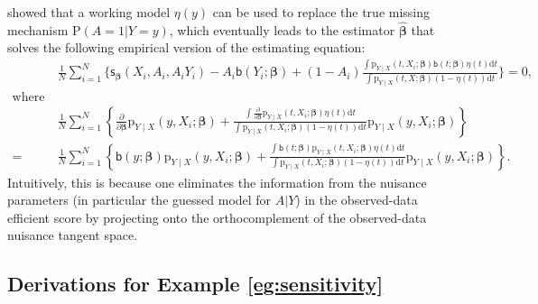 \documentclass{article}
\def\sfb{\mathsf{b}}
\def\sfb{\mathsf{b}}
\def\sfs{\mathsf{s}}
\theoremstyle{plain}
\theoremstyle{definition}
\theoremstyle{remark}
\def\P{\mathrm{P}}
\def\bbeta{\boldsymbol{\beta}}
\def\hat{\widehat}
\def\p{\mathrm{p}}
\begin{document}
\citet{zhao2022versatile} showed that a working model $\eta (y)$ can be used to replace the true missing mechanism $\P (A = 1 | Y = y)$, which eventually leads to the estimator $\hat{\bbeta}$ that solves the following empirical version of the estimating equation:
\begin{equation*}
\begin{aligned}
& \ \frac{1}{N} \sum_{i=1}^N \Bigg\{\sfs_\bbeta \left(X_i, A_i, A_i Y_i\right)-A_i \sfb\left(Y_i ; \bbeta\right)+\left(1-A_i\right) \frac{\int \p_{Y \mid X}\left(t, X_i ; \bbeta\right) \sfb(t ; \bbeta) \eta(t) \mathrm{d} t}{\int \p_{Y \mid X}(t, X ; \bbeta)\left(1-\eta(t)\right) \mathrm{d} t}\Bigg\}=0, \\
 \text{where} & \\
& \ \frac{1}{N} \sum_{i=1}^N\left\{\frac{\partial}{\partial \bbeta} \p_{Y \mid X}\left(y, X_i ; \bbeta\right)+\frac{\int \frac{\partial}{\partial \bbeta} \p_{Y \mid X}\left(t, X_i ; \bbeta\right) \eta (t) \mathrm{d} t}{\int \p_{Y \mid X}\left(t, X_i ; \bbeta\right)\left(1-\eta(t)\right) \mathrm{d} t} \p_{Y \mid X}\left(y, X_i ; \bbeta\right)\right\} \\
= & \ \frac{1}{N} \sum_{i=1}^N\left\{\sfb (y ; \bbeta) \p_{Y \mid X}\left(y, X_i ; \bbeta\right)+\frac{\int \sfb(t ; \bbeta) \p_{Y \mid X}\left(t, X_i ; \bbeta\right) \eta (t) \mathrm{d} t}{\int \p_{Y \mid X}\left(t, X_i ; \bbeta\right)\left(1-\eta(t)\right) \mathrm{d} t} \p_{Y \mid X}\left(y, X_i ; \bbeta\right)\right\} .
\end{aligned}
\end{equation*}
Intuitively, this is because one eliminates the information from the nuisance parameters (in particular the guessed model for $A | Y$) in the observed-data efficient score by projecting onto the orthocomplement of the observed-data nuisance tangent space.

\subsection{Derivations for Example \ref{eg:sensitivity}}
\label{app:Proof_sens}
\end{document}
